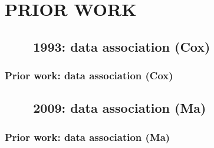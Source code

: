 \section{PRIOR WORK}
\subsection{\ \ \ \ 1993: data association (Cox)}
\begin{frame}
\frametitle{Prior work: data association (Cox)}
\framesubtitle{}
\mypagenum
{}
\end{frame}

\subsection{\ \ \ \ 2009: data association (Ma)}
\begin{frame}
\frametitle{Prior work: data association (Ma)}
\framesubtitle{}
\mypagenum
{}
\end{frame}



\printbibliography




